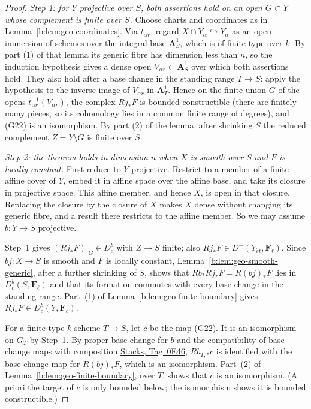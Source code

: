 \documentclass[11pt,a4paper]{article}
\numberwithin{equation}{section}
\theoremstyle{definition}
\theoremstyle{remark}
\newcommand{\Dbc}{D^b_c}
\newcommand{\Fell}{\mathbf F_\ell}
\newcommand{\et}{\acute{e}t}
\newcommand{\stacks}[1]{\href{https://stacks.math.columbia.edu/tag/#1}{\textnormal{Stacks, Tag~#1}}}
\begin{document}
\begin{proof}
\emph{Step 1: for \(Y\) projective over \(S\), both assertions hold on
an open \(G\subset Y\) whose complement is finite over \(S\).} Choose
charts and coordinates as in Lemma~\ref{b:lem:geo-coordinates}. Via
\(t_{\alpha r}\), regard \(X\cap Y_\alpha\hookrightarrow Y_\alpha\) as an
open immersion of schemes over the integral base \(\mathbf A^1_S\),
which is of finite type over \(k\). By part (1) of that lemma its
generic fibre has dimension less than \(n\), so the induction
hypothesis gives a dense open \(V_{\alpha r}\subset\mathbf A^1_S\) over
which both assertions hold. They also hold after a base
change in the standing range \(T\to S\): apply the hypothesis to the inverse image of
\(V_{\alpha r}\) in \(\mathbf A^1_T\). Hence on the finite union \(G\)
of the opens \(t_{\alpha r}^{-1}(V_{\alpha r})\), the complex
\(Rj_*F\) is bounded constructible (there are finitely many pieces, so
its cohomology lies in a common finite range of degrees), and (G22) is
an isomorphism. By part (2) of the lemma, after shrinking \(S\) the
reduced complement \(Z=Y\setminus G\) is finite over \(S\).

\emph{Step 2: the theorem holds in dimension \(n\) when \(X\) is
smooth over \(S\) and \(F\) is locally constant.} First reduce to
\(Y\) projective. Restrict to a member of a finite affine cover of
\(Y\), embed it in affine space over the affine base, and take its
closure in projective space. This affine member, and hence \(X\), is
open in that closure. Replacing the closure by the closure of \(X\)
makes \(X\) dense without changing its generic fibre, and a result
there restricts to the affine member. So we may assume \(b:Y\to S\)
projective.

Step~1 gives \((Rj_*F)|_G\in\Dbc\) with \(Z\to S\) finite; also
\(Rj_*F\in D^+(Y_{\et},\Fell)\). Since \(bj:X\to S\) is smooth and \(F\)
is locally constant, Lemma~\ref{b:lem:geo-smooth-generic}, after a
further shrinking of \(S\), shows that \(Rb_*Rj_*F=R(bj)_*F\) lies in
\(\Dbc(S,\Fell)\) and that its formation commutes with every base change
in the standing range. Part~(1) of Lemma~\ref{b:lem:geo-finite-boundary} gives
\(Rj_*F\in\Dbc(Y,\Fell)\).

For a finite-type $k$-scheme \(T\to S\), let \(c\) be the map (G22). It is an
isomorphism on \(G_T\) by Step~1. By proper base change for \(b\) and
the compatibility of base-change maps with composition \stacks{0E46},
\(Rb_{T,*}c\) is identified with the base-change map for \(R(bj)_*F\),
which is an isomorphism. Part~(2) of
Lemma~\ref{b:lem:geo-finite-boundary}, over \(T\), shows that \(c\) is
an isomorphism. (A priori the target of \(c\) is only bounded below;
the isomorphism shows it is bounded constructible.)


\end{proof}
\end{document}
